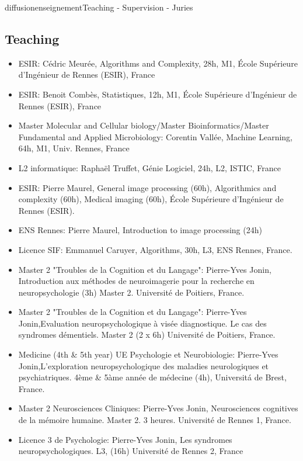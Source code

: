 \documentclass{ra2018}
\begin{document}
\begin{module}{diffusion}{enseignement}{Teaching - Supervision - Juries}

\subsection {Teaching}

\begin{itemize}
    \item ESIR: Cédric Meurée, Algorithms and Complexity, 28h, M1, École Supérieure d’Ingénieur de Rennes (ESIR), France
    \item ESIR: Benoit Combès, Statistiques, 12h, M1, École Supérieure d’Ingénieur de Rennes (ESIR), France
    \item Master Molecular and Cellular biology/Master Bioinformatics/Master Fundamental and Applied Microbiology: Corentin Vallée, Machine Learning, 64h, M1, Univ. Rennes, France
    \item L2 informatique: Raphaël Truffet, Génie Logiciel, 24h, L2, ISTIC, France
    \item ESIR: Pierre Maurel, General image processing (60h), Algorithmics and complexity (60h), Medical imaging (60h), École Supérieure d’Ingénieur de Rennes (ESIR).
    \item ENS Rennes: Pierre Maurel, Introduction to image processing (24h)
    \item Licence SIF: Emmanuel Caruyer, Algorithms, 30h, L3, ENS Rennes, France.
    \item Master 2 "Troubles de la Cognition et du Langage": Pierre-Yves Jonin, Introduction aux méthodes de neuroimagerie pour la recherche en neuropsychologie (3h) Master 2. Université de Poitiers, France.
    \item Master 2 "Troubles de la Cognition et du Langage": Pierre-Yves Jonin,Evaluation neuropsychologique à visée diagnostique. Le cas des syndromes démentiels. Master 2 (2 x 6h) Université de Poitiers, France.
    \item Medicine (4th \& 5th year) UE Psychologie et Neurobiologie: Pierre-Yves Jonin,L'exploration neuropsychologique des maladies neurologiques et psychiatriques. 4\`eme \& 5\`ame année de m\'edecine (4h), Universit\'a de Brest, France.
    \item Master 2 Neurosciences Cliniques: Pierre-Yves Jonin, Neurosciences cognitives de la mémoire humaine. Master 2. 3 heures. Université de Rennes 1, France.
    \item Licence 3 de Psychologie: Pierre-Yves Jonin, Les syndromes neuropsychologiques. L3, (16h) Université de Rennes 2, France

\end{itemize}
\end{module}
\end{document}
